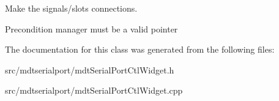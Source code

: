 Make the signals/slots connections. 

\begin{DoxyPrecond}{Precondition}
manager must be a valid pointer 
\end{DoxyPrecond}


The documentation for this class was generated from the following files:\begin{DoxyCompactItemize}
\item 
src/mdtserialport/mdtSerialPortCtlWidget.h\item 
src/mdtserialport/mdtSerialPortCtlWidget.cpp\end{DoxyCompactItemize}
